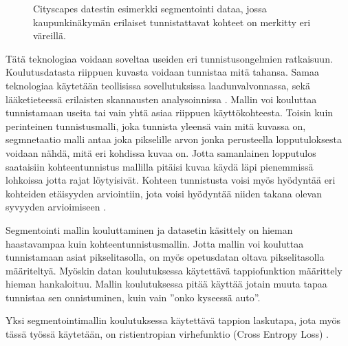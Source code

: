 \begin{figure}[h]
\centering
{}
\caption[Tämä on lyhyt kuvateksti.]{Cityscapes datestin esimerkki segmentointi dataa, jossa kaupunkinäkymän erilaiset tunnistattavat kohteet on merkitty eri väreillä.}
\label{fig:labels}
\end{figure}

Tätä teknologiaa voidaan soveltaa useiden eri tunnistusongelmien ratkaisuun.
Koulutusdatasta riippuen kuvasta voidaan tunnistaa mitä tahansa.
Samaa teknologiaa käytetään teollisissa sovellutuksissa laadunvalvonnassa,
sekä lääketieteessä erilaisten skannausten analysoinnissa \cite{NagalakshmiT2022BCSS}.
Mallin voi kouluttaa tunnistamaan useita tai vain yhtä asiaa riippuen käyttökohteesta.
Toisin kuin perinteinen tunnistusmalli, joka tunnista yleensä vain mitä kuvassa on,
segmnetaatio malli antaa joka pikselille arvon jonka perusteella lopputuloksesta voidaan nähdä, mitä eri kohdissa kuvaa on.
Jotta samanlainen lopputulos saataisiin kohteentunnistus mallilla pitäisi kuvaa käydä läpi pienemmissä lohkoissa jotta rajat löytyisivät.
Kohteen tunnistusta voisi myös hyödyntää eri kohteiden etäisyyden arviointiin, jota voisi hyödyntää niiden takana olevan syvyyden arvioimiseen \cite{ShiZhou2023VRBo}.

Segmentointi mallin kouluttaminen ja datasetin käsittely on hieman haastavampaa kuin kohteentunnistusmallin.
Jotta mallin voi kouluttaa tunnistamaan asiat pikselitasolla, on myös opetusdatan oltava pikselitasolla määriteltyä. 
Myöskin datan koulutuksessa käytettävä tappiofunktion määrittely hieman hankaloituu.
Mallin koulutuksessa pitää käyttää jotain muuta tapaa tunnistaa sen onnistuminen, kuin vain ”onko kyseessä auto”.

Yksi segmentointimallin koulutuksessa käytettävä tappion laskutapa, 
jota myös tässä työssä käytetään, on ristientropian virhefunktio (Cross Entropy Loss) \cite{CrossEntropyLoss}. 

